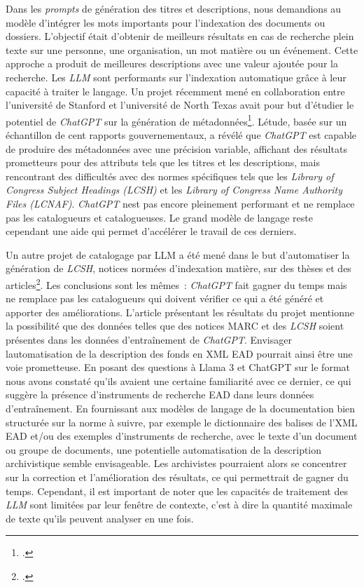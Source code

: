 	Dans les \textit{prompts} de génération des titres et descriptions, nous
	demandions au modèle d'intégrer les mots importants pour l'indexation
	des documents ou dossiers. L'objectif était d'obtenir
	de meilleurs résultats en cas de recherche plein texte sur une
	personne, une organisation, un mot matière ou un événement. Cette
	approche a produit de meilleures descriptions avec une valeur ajoutée
	pour la recherche. Les \emph{LLM} sont performants sur l'indexation automatique
	grâce à leur capacité à traiter le langage. Un projet récemment mené en
	collaboration entre l'université de Stanford et l'université de North
	Texas avait pour but d'étudier le potentiel de \emph{ChatGPT} sur la
	génération de métadonnées\footcite{noauthor_comparative_nodate}.
	L\textquotesingle étude, basée sur un échantillon de cent rapports
	gouvernementaux, a révélé que \emph{ChatGPT} est capable de produire des
	métadonnées avec une précision variable, affichant des résultats
	prometteurs pour des attributs tels que les titres et les descriptions,
	mais rencontrant des difficultés avec des normes spécifiques tels que
	les \emph{Library of Congress Subject Headings (LCSH)} et les
	\emph{Library of Congress Name Authority Files (LCNAF)}. \emph{ChatGPT}
	n\textquotesingle est pas encore pleinement performant et ne remplace
	pas les catalogueurs et catalogueuses. Le grand modèle de langage reste cependant une aide qui permet
	d'accélérer le travail de ces derniers. 
	
	Un autre projet de catalogage par
	LLM a été mené dans le but d'automatiser la génération de
	\emph{LCSH}, notices normées d'indexation matière,
	sur des thèses et des articles\footcite{chow_experiment_2024}.
	Les conclusions sont les mêmes~: \emph{ChatGPT} fait gagner du temps mais ne
	remplace pas les catalogueurs qui doivent vérifier ce qui a été généré
	et apporter des améliorations. L'article présentant les résultats du
	projet mentionne la possibilité que des données telles que des notices
	MARC et des \emph{LCSH} soient présentes dans les données d'entraînement de
	\emph{ChatGPT}. 	
	Envisager l\textquotesingle automatisation de la
	description des fonds en XML EAD pourrait ainsi être une voie prometteuse. En
	posant des questions à Llama 3 et ChatGPT sur le format nous avons
	constaté qu'ils avaient une certaine familiarité avec ce dernier, ce qui
	suggère la présence d'instruments de recherche EAD dans leurs données
	d'entraînement. En fournissant aux modèles de langage de la
	documentation bien structurée sur la norme à suivre, par exemple le
	dictionnaire des balises de l'XML EAD et/ou des exemples d'instruments
	de recherche, avec le texte d'un document ou groupe de documents, une
	potentielle automatisation de la description archivistique semble
	envisageable. Les archivistes pourraient alors se concentrer sur la
	correction et l'amélioration des résultats, ce qui permettrait de gagner
	du temps. Cependant, il est important de noter que les capacités de
	traitement des \emph{LLM} sont limitées par leur {fenêtre} de contexte, c'est à
	dire la quantité maximale de texte qu'ils peuvent analyser en une fois.\newline
	
